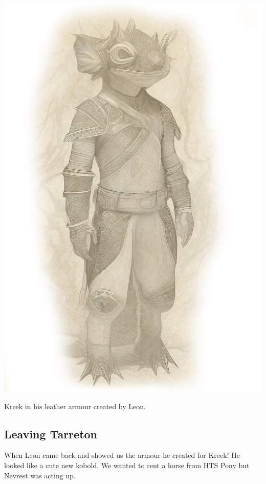 \vfill
\begin{center}
    \includegraphics[height=\textheight/4,keepaspectratio]{images/kreek_sketch.png}
    \begin{DndReadAloud}
        Kreek in his leather armour created by Leon.
    \end{DndReadAloud}
\end{center}


\newpage

\subsection*{Leaving Tarreton}
When Leon came back and showed us the armour he created for Kreek! He looked like a cute new kobold. We wanted to rent a horse from HTS Pony but Nevrest was acting up.

